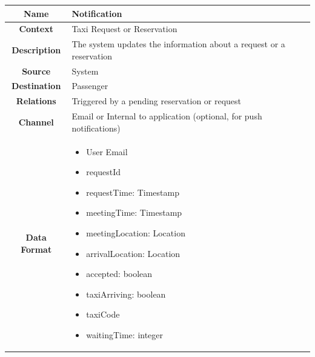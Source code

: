 \documentclass[11pt, a4paper,titlepage]{article}
\begin{document}
				\begin{tabularx}{\textwidth}{| c | X |}
					\hline
					\textbf{Name} & 
					Notification
					\\
					\hline
					\textbf{Context} & 
					Taxi Request or Reservation
					\\
					\hline
					\textbf{Description} & 
					The system updates the information about a request or a reservation
					\\
					\hline
					\textbf{Source} &
					System
					\\
					\hline
					\textbf{Destination} & 
					Passenger
					\\
					\hline
					\textbf{Relations} & 
					Triggered by a pending reservation or request
					\\
					\hline
					\textbf{Channel} & 
					Email or Internal to application (optional, for push notifications)
					\\
					\hline
					\textbf{Data Format} & 
					\begin{itemize}
						\item User Email
						\item requestId
						\item requestTime: Timestamp
						\item meetingTime: Timestamp
						\item meetingLocation: Location
						\item arrivalLocation: Location
						\item accepted: boolean
						\item taxiArriving: boolean
						\item taxiCode
						\item waitingTime: integer
					\end{itemize}
					\\
					\hline		
				\end{tabularx}
				
\end{document}

